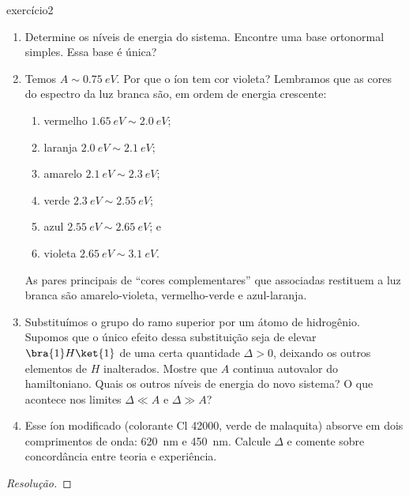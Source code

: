 \begin{exercício}{}{exercício2}
\begin{enumerate}[label=(\alph*)]
        \item Determine os níveis de energia do sistema. Encontre uma base ortonormal simples. Essa base é única?
    \item Temos \(A \sim \SI{0.75}{eV}.\) Por que o íon tem cor violeta? Lembramos que as cores do espectro da luz branca são, em ordem de energia crescente:
        \begin{enumerate}[label=(\roman*)]
            \item vermelho \(\SI{1.65}{eV} \sim \SI{2.0}{eV}\);
            \item laranja \(\SI{2.0}{eV} \sim \SI{2.1}{eV}\);
            \item amarelo \(\SI{2.1}{eV} \sim \SI{2.3}{eV}\);
            \item verde \(\SI{2.3}{eV} \sim \SI{2.55}{eV}\);
            \item azul \(\SI{2.55}{eV} \sim \SI{2.65}{eV}\); e
            \item violeta \(\SI{2.65}{eV} \sim \SI{3.1}{eV}\).
        \end{enumerate}
        As pares principais de \enquote{cores complementares} que associadas restituem a luz branca são amarelo-violeta, vermelho-verde e azul-laranja.
    \item Substituímos o grupo  do ramo superior por um átomo de hidrogênio. Supomos que o único efeito dessa substituição seja de elevar \(\bra{1}H\ket{1}\) de uma certa quantidade \(\Delta > 0\), deixando os outros elementos de \(H\) inalterados. Mostre que \(A\) continua autovalor do hamiltoniano. Quais os outros níveis de energia do novo sistema? O que acontece nos limites \(\Delta \ll A\) e \(\Delta \gg A\)?
    \item Esse íon modificado (colorante Cl 42000, verde de malaquita) absorve em dois comprimentos de onda: \SI{620}{nm} e \SI{450}{nm}. Calcule \(\Delta\) e comente sobre concordância entre teoria e experiência.
    \end{enumerate}
\end{exercício}
\begin{proof}[Resolução]
\end{proof}
